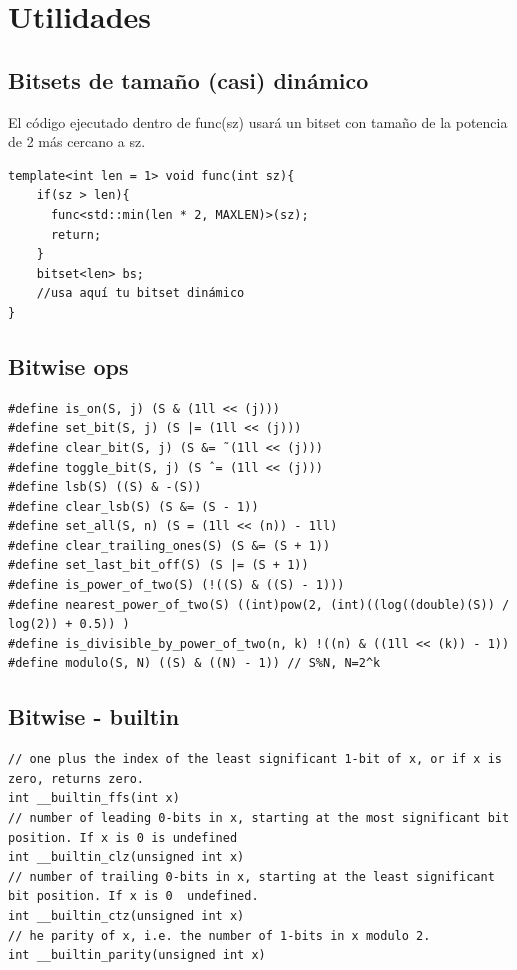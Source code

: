 \section{Utilidades}



\subsection{Bitsets de tamaño (casi) dinámico}
El código ejecutado dentro de func(sz) usará un bitset con tamaño de la potencia de 2 más cercano a sz.
\begin{verbatim}
template<int len = 1> void func(int sz){
    if(sz > len){
      func<std::min(len * 2, MAXLEN)>(sz);
      return;
    }
    bitset<len> bs;
    //usa aquí tu bitset dinámico
}
\end{verbatim}



\subsection{Bitwise ops}
\begin{verbatim}
#define is_on(S, j) (S & (1ll << (j)))
#define set_bit(S, j) (S |= (1ll << (j)))
#define clear_bit(S, j) (S &= ˜(1ll << (j)))
#define toggle_bit(S, j) (S ˆ= (1ll << (j)))
#define lsb(S) ((S) & -(S))
#define clear_lsb(S) (S &= (S - 1))
#define set_all(S, n) (S = (1ll << (n)) - 1ll)
#define clear_trailing_ones(S) (S &= (S + 1))
#define set_last_bit_off(S) (S |= (S + 1))
#define is_power_of_two(S) (!((S) & ((S) - 1)))
#define nearest_power_of_two(S) ((int)pow(2, (int)((log((double)(S)) / log(2)) + 0.5)) )
#define is_divisible_by_power_of_two(n, k) !((n) & ((1ll << (k)) - 1))
#define modulo(S, N) ((S) & ((N) - 1)) // S%N, N=2^k
\end{verbatim}

\vspace{-0.7\baselineskip}

\subsection{Bitwise - builtin}
\begin{verbatim}
// one plus the index of the least significant 1-bit of x, or if x is zero, returns zero.
int __builtin_ffs(int x)
// number of leading 0-bits in x, starting at the most significant bit position. If x is 0 is undefined
int __builtin_clz(unsigned int x)
// number of trailing 0-bits in x, starting at the least significant bit position. If x is 0  undefined.
int __builtin_ctz(unsigned int x)
// he parity of x, i.e. the number of 1-bits in x modulo 2.
int __builtin_parity(unsigned int x)
\end{verbatim}



